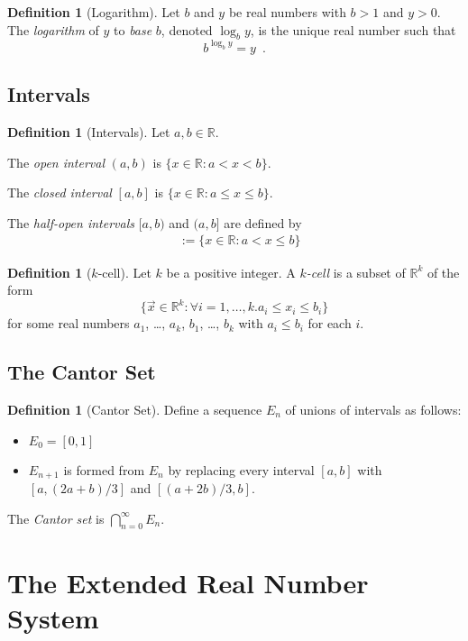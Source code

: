 \documentclass{book}
\theoremstyle{definition}
\newtheorem{df}[prop]{Definition}
\begin{document}
\begin{df}[Logarithm]
Let $b$ and $y$ be real numbers with $b > 1$ and $y > 0$. The \emph{logarithm} of $y$ to \emph{base} $b$, denoted $\log_b y$, is the unique real number such that
\[ b^{\log_b y} = y \enspace . \]
\end{df}

\subsection{Intervals}

\begin{df}[Intervals]
Let $a, b \in \mathbb{R}$. 

The \emph{open interval} $(a,b)$ is $\{ x \in \mathbb{R} : a < x < b \}$.

The \emph{closed interval} $[a,b]$ is $\{ x \in \mathbb{R} : a \leq x \leq b \}$.

The \emph{half-open intervals} $[a,b)$ and $(a,b]$ are defined by
\begin{align*}
[a,b) & := \{ x \in \mathbb{R} : a \leq x < b \} \\
(a,b] & := \{ x \in \mathbb{R} : a < x \leq b \}
\end{align*}
\end{df}

\begin{df}[$k$-cell]
Let $k$ be a positive integer. A \emph{$k$-cell} is a subset of $\mathbb{R}^k$ of the form
\[ \{ \vec{x} \in \mathbb{R}^k : \forall i = 1, \ldots, k. a_i \leq x_i \leq b_i \} \]
for some real numbers $a_1$, \ldots, $a_k$, $b_1$, \ldots, $b_k$ with $a_i \leq b_i$ for each $i$.
\end{df}

\subsection{The Cantor Set}

\begin{df}[Cantor Set]
Define a sequence $E_n$ of unions of intervals as follows:
\begin{itemize}
\item $E_0 = [0,1]$
\item $E_{n+1}$ is formed from $E_n$ by replacing every interval $[a,b]$ with $[a,(2a+b)/3]$ and $[(a+2b)/3,b]$.
\end{itemize}
The \emph{Cantor set} is $\bigcap_{n=0}^\infty E_n$.
\end{df}

\section{The Extended Real Number System}
\end{document}
